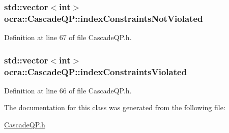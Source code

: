 \subsubsection[{\texorpdfstring{index\+Constraints\+Not\+Violated}{indexConstraintsNotViolated}}]{\setlength{\rightskip}{0pt plus 5cm}std\+::vector$<$int$>$ ocra\+::\+Cascade\+Q\+P\+::index\+Constraints\+Not\+Violated\hspace{0.3cm}{\ttfamily [protected]}}\hypertarget{classocra_1_1CascadeQP_aff033d8c8c8804f1105d461e0ef7ed12}{}\label{classocra_1_1CascadeQP_aff033d8c8c8804f1105d461e0ef7ed12}


Definition at line 67 of file Cascade\+Q\+P.\+h.

\subsubsection[{\texorpdfstring{index\+Constraints\+Violated}{indexConstraintsViolated}}]{\setlength{\rightskip}{0pt plus 5cm}std\+::vector$<$int$>$ ocra\+::\+Cascade\+Q\+P\+::index\+Constraints\+Violated\hspace{0.3cm}{\ttfamily [protected]}}\hypertarget{classocra_1_1CascadeQP_a7f6949ea468c0b2536fd97b8e1eb262f}{}\label{classocra_1_1CascadeQP_a7f6949ea468c0b2536fd97b8e1eb262f}


Definition at line 66 of file Cascade\+Q\+P.\+h.



The documentation for this class was generated from the following file\+:\begin{DoxyCompactItemize}
\item 
\hyperlink{CascadeQP_8h}{Cascade\+Q\+P.\+h}\end{DoxyCompactItemize}
